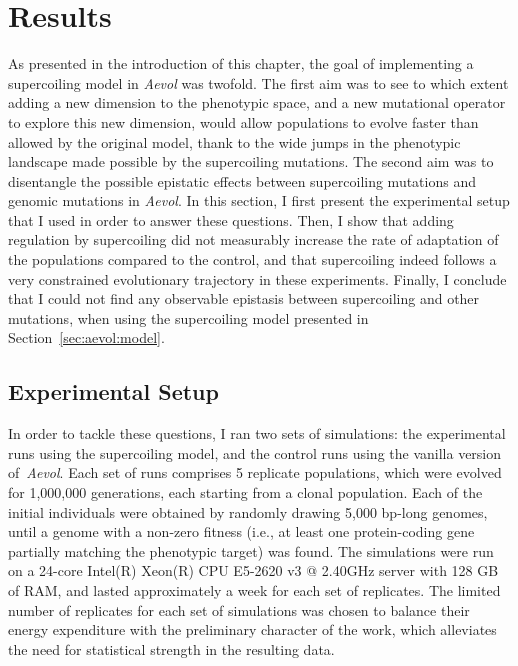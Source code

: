 \section{Results}
\label{sec:aevol:results}

As presented in the introduction of this chapter, the goal of implementing a supercoiling model in \emph{Aevol} was twofold.
The first aim was to see to which extent adding a new dimension to the phenotypic space, and a new mutational operator to explore this new dimension, would allow populations to evolve faster than allowed by the original model, thank to the wide jumps in the phenotypic landscape made possible by the supercoiling mutations.
The second aim was to disentangle the possible epistatic effects between supercoiling mutations and genomic mutations in \emph{Aevol}.
In this section, I first present the experimental setup that I used in order to answer these questions.
Then, I show that adding regulation by supercoiling did not measurably increase the rate of adaptation of the populations compared to the control, and that supercoiling indeed follows a very constrained evolutionary trajectory in these experiments.
Finally, I conclude that I could not find any observable epistasis between supercoiling and other mutations, when using the supercoiling model presented in Section~\ref{sec:aevol:model}.

\subsection{Experimental Setup}

In order to tackle these questions, I ran two sets of simulations: the experimental runs using the supercoiling model, and the control runs using the vanilla version of \emph{Aevol}.
Each set of runs comprises 5 replicate populations, which were evolved for 1,000,000 generations, each starting from a clonal population.
Each of the initial individuals were obtained by randomly drawing 5,000 bp-long genomes, until a genome with a non-zero fitness (i.e., at least one protein-coding gene partially matching the phenotypic target) was found.
The simulations were run on a 24-core Intel(R) Xeon(R) CPU E5-2620 v3 @ 2.40GHz server with 128 GB of RAM, and lasted approximately a week for each set of replicates.
The limited number of replicates for each set of simulations was chosen to balance their energy expenditure with the preliminary character of the work, which alleviates the need for statistical strength in the resulting data.

